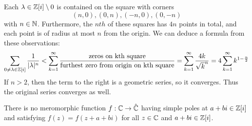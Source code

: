 \documentclass{homework}
\begin{document}
                                                                                                                                        \begin{solution}
                                                                                                                                        Each $\lambda\in\mathbb{Z}[i]\setminus 0$ is contained on the square with corners \[(n, 0), (0, n), (-n, 0), (0, -n)\] with $n\in \mathbb{N}$. Furthermore, the $nth$ of these squares has $4n$ points in total, and each point is of radius at most $n$ from the origin. We can deduce a formula from these observations:
                                                                                                                                        \[
                                                                                                                                        \sum_{0 \neq \lambda \in \mathbb{Z}[i]} \frac{1}{|\lambda|^n} < \sum_{k=1}^\infty \frac{\text{zeros on kth square}}{\text{furthest zero from origin on kth square}} = \sum_{k=1}^\infty \frac{4k}{\sqrt{k}^n} = 4\sum_{k=1}^\infty k^{1-\frac{n}{2}}
                                                                                                                                        \]
                                                                                                                                        If $n > 2$, then the term to the right is a geometric series, so it converges. Thus the original series converges as well.
                                                                                                                                        \end{solution}
                                                                                                                                        \begin{problem}\label{elliptic-more-than-two-poles}There is no meromorphic function $f : \mathbb{C} \to \hat{\mathbb{C}}$ having simple poles at $a+bi \in \mathbb{Z}[i]$ and satisfying $f(z) = f(z+a+bi)$ for all $z \in \mathbb{C}$ and $a+bi \in \mathbb{Z}[i]$.
                                                                                                                                        \end{problem}
\end{document}
